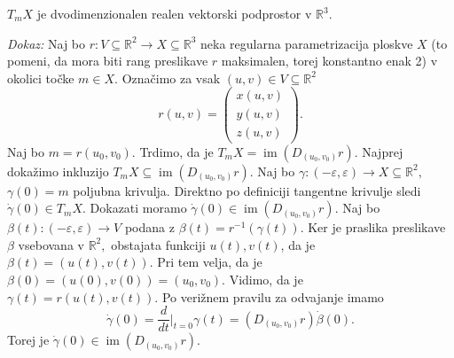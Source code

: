 \begin{trditev}
\label{trd_tangentna_ravnina_je_dvodimenzionalen_vektorski_prostor}
$T_mX$ je dvodimenzionalen realen vektorski podprostor v
$\mathbb{R}^3$. 
\end{trditev} 
{\em Dokaz:\/} Naj bo $r : V
\subseteq  \mathbb{R}^2 \to X \subseteq \mathbb{R}^3$ neka regularna
parametrizacija ploskve $X$ (to pomeni, da mora biti rang preslikave
$r$ maksimalen, torej konstantno enak 2) v okolici točke  $m \in  X$.  Označimo za vsak $\left( u, v \right) \in  V \subseteq \mathbb{R}^2$ \begin{equation*} r\left( u,v \right) = 
\begin{pmatrix} x\left( u,v
\right) \\ y\left( u,v \right) \\ z\left( u,v \right)
\end{pmatrix} . \end{equation*}
Naj bo $m = r\left( u_0, v_0 \right).$ Trdimo, da
je $ T_mX = \operatorname{im} \left( D_{(u_0, v_0)}r \right) $.
Najprej dokažimo inkluzijo $T_mX \subseteq \operatorname{im} \left(
D_{(u_0, v_0)}r \right)$. 
Naj bo $\gamma: \left( -\varepsilon,
\varepsilon \right) \to X \subseteq \mathbb{R}^2,$ $\gamma \left( 0
\right) = m$ poljubna krivulja. Direktno
po definiciji tangentne krivulje sledi $\dot{\gamma}\left( 0 \right)
\in T_mX$. 
Dokazati moramo $\dot{\gamma}(0) \in \operatorname{im} \left(D_{\left( u_0, v_0 \right)} r \right)$. Naj bo
$\beta \left( t \right) : \left( -\varepsilon, \varepsilon \right)\to
V$ podana z $\beta\left( t \right) = r^{-1}\left( \gamma\left( t
\right) \right)$. Ker je praslika preslikave $\beta$ vsebovana v
$\mathbb{R}^2,$ obstajata funkciji $u\left( t \right), v\left( t
\right)$, da je $\beta\left( t \right) = \left( u(t), v(t) \right).$
Pri tem velja, da je $\beta(0) = (u(0), v(0)) = (u_0, v_0).$ Vidimo,
da je $\gamma(t) = r(u(t), v(t)).$ Po verižnem pravilu za odvajanje
imamo \begin{equation*} \dot{\gamma }(0)= \frac{d}{dt} \big|_{t = 0} \gamma(t) =
\left( D_{ (u_0, v_0)}r \right) \dot{\beta} (0).\end{equation*}Torej je
$\dot{\gamma} (0) \in \operatorname{im} \left( D_{(u_0,v_0)}r
\right).$ 

